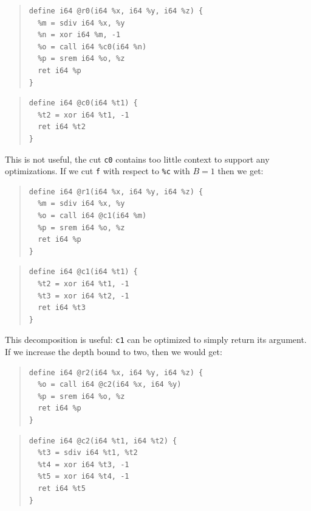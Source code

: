 \begin{multicols}{2}
{\small\begin{quote}
\begin{verbatim}
define i64 @r0(i64 %x, i64 %y, i64 %z) {
  %m = sdiv i64 %x, %y
  %n = xor i64 %m, -1
  %o = call i64 %c0(i64 %n)
  %p = srem i64 %o, %z
  ret i64 %p
}
\end{verbatim}
\end{quote}}
\columnbreak
{\small\begin{quote}
\begin{verbatim}
define i64 @c0(i64 %t1) {
  %t2 = xor i64 %t1, -1
  ret i64 %t2
}
\end{verbatim}
\end{quote}}
\end{multicols}

This is not useful, the cut \texttt{c0} contains too little context
to support any optimizations.
%
If we cut \texttt{f} with respect to \texttt{\%c} with $B = 1$ then we get:

\begin{multicols}{2}
{\small\begin{quote}
\begin{verbatim}
define i64 @r1(i64 %x, i64 %y, i64 %z) {
  %m = sdiv i64 %x, %y
  %o = call i64 @c1(i64 %m)
  %p = srem i64 %o, %z
  ret i64 %p
}
\end{verbatim}
\end{quote}}
\columnbreak
{\small\begin{quote}
\begin{verbatim}
define i64 @c1(i64 %t1) {
  %t2 = xor i64 %t1, -1
  %t3 = xor i64 %t2, -1
  ret i64 %t3
}
\end{verbatim}
\end{quote}}
\end{multicols}

This decomposition is useful: \texttt{c1} can be optimized to simply
return its argument.
%
If we increase the depth bound to two, then we would get:

\begin{multicols}{2}
{\small\begin{quote}
\begin{verbatim}
define i64 @r2(i64 %x, i64 %y, i64 %z) {
  %o = call i64 @c2(i64 %x, i64 %y)
  %p = srem i64 %o, %z
  ret i64 %p
}
\end{verbatim}
\end{quote}}
\columnbreak
{\small\begin{quote}
\begin{verbatim}
define i64 @c2(i64 %t1, i64 %t2) {
  %t3 = sdiv i64 %t1, %t2
  %t4 = xor i64 %t3, -1
  %t5 = xor i64 %t4, -1
  ret i64 %t5
}
\end{verbatim}
\end{quote}}
\end{multicols}

